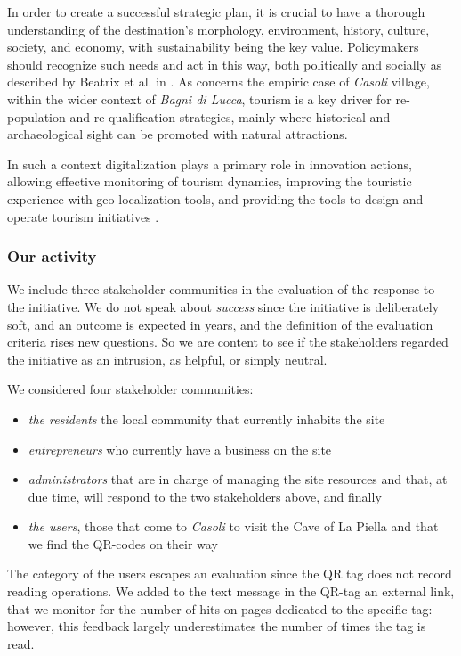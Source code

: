 \documentclass[sustainability,article,submit,pdftex,moreauthors]{Definitions/mdpi}
\begin{document}
In order to create a successful strategic plan, it is crucial to have a thorough understanding of the destination's morphology, environment, history, culture, society, and economy, with sustainability being the key value.
Policymakers should recognize such needs and act in this way, both politically and socially as described by Beatrix et al. in \cite{bea10}. As concerns the empiric case of \emph{Casoli} village, within the wider context of \emph{Bagni di Lucca}, tourism is a key driver for re-population and re-qualification strategies, mainly where historical and archaeological sight can be promoted with natural attractions.

In such a context digitalization plays a primary role in innovation actions, allowing effective monitoring of tourism dynamics, improving the touristic experience with geo-localization tools, and providing the tools to design and operate tourism initiatives \cite{lem22}.

\subsubsection{Our activity}

We include three stakeholder communities in the evaluation of the response to the initiative. We do not speak about {\em success} since the initiative is deliberately soft, and an outcome is expected in years, and the definition of the evaluation criteria rises new questions. So we are content to see if the stakeholders regarded the initiative as an intrusion, as helpful, or simply neutral.

We considered four stakeholder communities:

\begin{itemize}
	\item {\em the residents} the local community that currently inhabits the site
	\item {\em entrepreneurs} who currently have a business on the site
	\item {\em administrators} that are in charge of managing the site resources and that, at due time, will respond to the two stakeholders above, and finally
	\item {\em the users}, those that come to \emph{Casoli} to visit the Cave of La Piella and that we find the QR-codes on their way
\end{itemize}

The category of the users escapes an evaluation since the QR tag does not record reading operations. We added to the text message in the QR-tag an external link, that we monitor for the number of hits on pages dedicated to the specific tag: however, this feedback largely underestimates the number of times the tag is read. 
\end{document}
